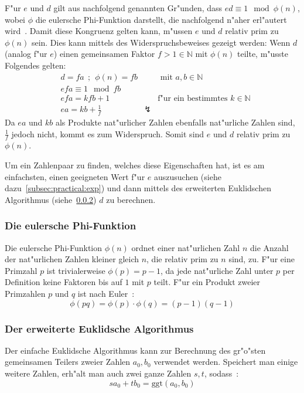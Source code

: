 \documentclass[12pt]{article}
\begin{document}
F"ur $e$ und $d$ gilt aus nachfolgend genannten Gr"unden, dass $ed \equiv 1 \mod \phi(n)$,
wobei $\phi$ die eulersche Phi-Funktion darstellt, die nachfolgend n"aher erl"autert wird~\cite{rsa}.
Damit diese Kongruenz gelten kann, m"ussen $e$ und $d$ relativ prim zu $\phi(n)$ sein.
Dies kann mittels des Widerspruchsbeweises gezeigt werden:
Wenn $d$ (analog f"ur $e$) einen gemeinsamen Faktor $f > 1 \in \mathbb{N}$ mit $\phi(n)$ teilte, m"usste Folgendes gelten:
\begin{equation}
\label{eq:ed_prime_phi_n}
\begin{aligned}
&d = fa ~~;~~ \phi(n) = fb && \textrm{ mit } a, b \in \mathbb{N} \\
&efa \equiv 1 \mod fb \\
&efa = kfb + 1 && \textrm{f"ur ein bestimmtes } k \in \mathbb{N} \\
&ea = kb + \frac{1}{f} & \lightning &
\end{aligned}
\end{equation}
Da $ea$ und $kb$ als Produkte nat"urlicher Zahlen ebenfalls nat"urliche Zahlen sind, $\frac{1}{f}$ jedoch nicht, kommt es zum Widerspruch.
Somit sind $e$ und $d$ relativ prim zu $\phi(n)$.

Um ein Zahlenpaar zu finden, welches diese Eigenschaften hat,
ist es am einfachsten, einen geeigneten Wert f"ur $e$ auszusuchen (siehe dazu~\ref{subsec:practical:exp})
und dann mittels des erweiterten Euklidschen Algorithmus (siehe~\ref{subsubsec:math:euclid}) $d$ zu berechnen.

\subsubsection{Die eulersche Phi-Funktion}
Die eulersche Phi-Funktion $\phi(n)$ ordnet einer nat"urlichen Zahl $n$ die Anzahl
der nat"urlichen Zahlen kleiner gleich $n$, die relativ prim zu $n$ sind, zu.
F"ur eine Primzahl $p$ ist trivialerweise $\phi(p) = p-1$,
da jede nat"urliche Zahl unter $p$ per Definition keine Faktoren bis auf $1$ mit $p$ teilt.
F"ur ein Produkt zweier Primzahlen $p$ und $q$ ist nach Euler~\cite{euler63}:
\begin{equation}\label{eq:phi_calc}\phi(pq) = \phi(p) \cdot \phi(q) = (p-1)(q-1)\end{equation}

\subsubsection{Der erweiterte Euklidsche Algorithmus}
\label{subsubsec:math:euclid}
Der einfache Euklidsche Algorithmus kann zur Berechnung des gr"o"sten gemeinsamen
Teilers zweier Zahlen $a_0, b_0$ verwendet werden.
Speichert man einige weitere Zahlen, erh"alt man auch zwei ganze Zahlen $s, t$, sodass~\cite{taocp2}:
\begin{equation}\label{eq:euclid} sa_0 + tb_0 = \textrm{ggt}(a_0, b_0) \end{equation}
\end{document}
